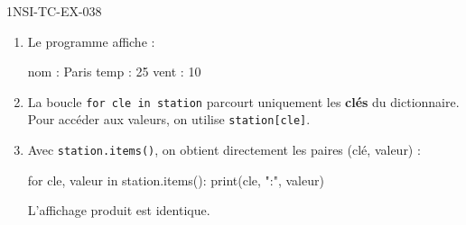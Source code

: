 \begin{corrige}{1NSI-TC-EX-038}
\begin{enumerate}
  \item Le programme affiche :
\begin{console}
nom : Paris
temp : 25
vent : 10
\end{console}

  \item La boucle \lstinline{for cle in station} parcourt uniquement les \textbf{clés} du dictionnaire. Pour accéder aux valeurs, on utilise \lstinline{station[cle]}.

  \item Avec \lstinline{station.items()}, on obtient directement les paires (clé, valeur) :
\begin{python}
for cle, valeur in station.items():
    print(cle, ":", valeur)
\end{python}
L'affichage produit est identique.
\end{enumerate}
\end{corrige}
